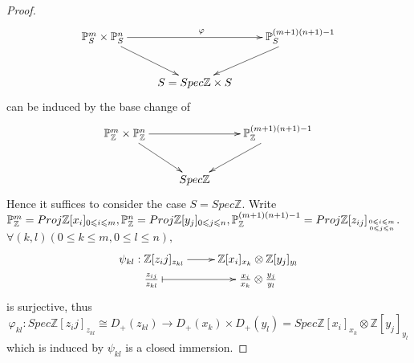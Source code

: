 \begin{proof}
\[ \xymatrix{
   {\mathbb{P}_S^m\times\mathbb{P}_S^n} \ar[dr] \ar[rr]^{\varphi} &
   & {\mathbb{P}_S^{(m+1)(n+1)-1}} \ar[dl]                        \\
   & {S=Spec\mathbb{Z}\times S} }  \]
can be induced by the base change of
\[ \xymatrix{
   {\mathbb{P}_{\mathbb{Z}}^m\times\mathbb{P}_{\mathbb{Z}}^n} \ar[dr] \ar[rr] &
   & {\mathbb{P}_{\mathbb{Z}}^{(m+1)(n+1)-1}} \ar[dl]                        \\
   & {Spec\mathbb{Z}} }  \]
Hence it suffices to consider the case $S=Spec\mathbb{Z}.$ Write
$\mathbb{P}_{\mathbb{Z}}^m=Proj\mathbb{Z}[x_i]_{0\leqslant
i\leqslant m},
\mathbb{P}_{\mathbb{Z}}^n=Proj\mathbb{Z}[y_j]_{0\leqslant j\leqslant
n},
\mathbb{P}_{\mathbb{Z}}^{(m+1)(n+1)-1}=Proj\mathbb{Z}[z_{ij}]_{0\leqslant
i\leqslant m \atop 0\leqslant j\leqslant n}.$ $\forall (k,
l)(0\leqslant k\leqslant m, 0\leqslant l\leqslant n),$
\[ \xymatrix@R=0em{
   {\psi_{kl}:\mathbb{Z}[z_ij]_{z_{kl}}} \ar[r] & {\mathbb{Z}[x_i]_{x_k}
   \otimes \mathbb{Z}[y_j]_{y_l}}               \\
   {\frac{z_{ij}}{z_{kl}}} \ar@{|->}[r] & {\frac{x_i}{x_k}\otimes
   \frac{y_j}{y_l}} }  \]
is surjective, thus
$$\varphi_{kl}:Spec\mathbb{Z}[z_ij]_{z_{kl}}\cong
D_+(z_{kl})\rightarrow D_+(x_k)\times
D_+(y_l)=Spec\mathbb{Z}[x_i]_{x_k}\otimes \mathbb{Z}[y_j]_{y_l}$$
which is induced by $\psi_{kl}$ is a closed immersion.


\end{proof}
